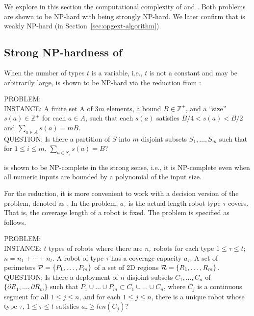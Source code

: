 We explore in this section the computational complexity of \opglr 
and \opgmc. Both problems are shown to be NP-hard with \opglr 
being strongly NP-hard. We later confirm that \opgmc is weakly 
NP-hard (in Section~\ref{sec:opgext-algorithm}).

\subsection{Strong NP-hardness of \opglr}\label{subsec:opgext-opglr-hardness}
When the number of types $t$ is a variable, i.e., $t$ is not a constant
and may be arbitrarily large,
\opglr is shown to be NP-hard via the reduction from \tpart \cite{garey1975complexity}:

\vspace*{1mm}
\noindent
PROBLEM: \tpart\\
INSTANCE: A finite set A of $3m$ elements, a bound $B\in \mathbb{Z^+}$, 
and a ``size'' $s(a)\in \mathbb{Z^+}$ for each $a\in A$,
such that each $s(a)$ satisfies $B/4 < s(a) <B/2$ and $\sum_{a\in A} s(a) = mB$.\\
QUESTION: Is there a partition of $S$ into $m$ disjoint subsets $S_1, 
\ldots, S_m$ such that for $1\leq i\leq m$, 
$\sum_{a\in S_i} s(a) = B$?
\vspace*{1mm}

\tpart is shown to be NP-complete in the strong sense\cite{GarJoh79}, 
i.e., it is NP-complete even when all numeric inputs are bounded by a polynomial 
of the input size. 

For the reduction, it is more convenient to work with a decision 
version of the \opglr problem, denoted as \opglrd. In the \opglrd 
problem, $a_{\tau}$ is the actual length robot type $\tau$ covers. 
That is, the coverage length of a robot is fixed. The \opglrd problem 
is specified as follows. 

\vspace*{1mm}
\noindent
PROBLEM: \opglrd\\
INSTANCE: $t$ types of robots where there are $n_{\tau}$ robots for 
each type $1 \le \tau \le t$; $n = n_1 + \cdots + n_t$. A robot of 
type $\tau$ has a coverage capacity $a_{\tau}$. A set of perimeters 
$\P = \{P_1, \ldots, P_m\}$ of a set of 2D regions 
$\R =\{R_1, \ldots, R_m\}$.\\ 
QUESTION: Is there a deployment of $n$ disjoint subsets $C_1, \ldots, C_n$
of $\{\partial R_1, \ldots, \partial R_m\}$ such that 
$P_1 \cup \ldots \cup P_m \subset C_1 \cup \ldots \cup C_n$, where
$C_j$ is a continuous segment for all $1 \le j \le n$, and for each 
$1 \le j \le n$, there is a unique robot whose type $\tau$, $1 \le \tau 
\le t$ satisfies $a_{\tau} \ge len(C_j)$?
\vspace*{1mm}

